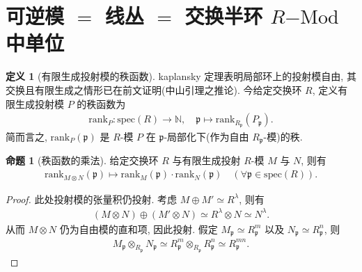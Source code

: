 \documentclass{MainStyle}
\theoremstyle{definition}
\theoremstyle{definition}
\theoremstyle{definition}
\newtheorem{definition}{定义}
\theoremstyle{definition}
\newtheorem{proposition}{命题}
\theoremstyle{definition}
\theoremstyle{definition}
\theoremstyle{definition}
\theoremstyle{remark}
\theoremstyle{remark}
\begin{document}
\maketitle

\section{可逆模 $=$ 线丛 $=$ 交换半环 $R\mathrm{-Mod}$ 中单位}

\begin{definition}[有限生成投射模的秩函数]
    kaplansky 定理表明局部环上的投射模自由, 其交换且有限生成之情形已在前文证明(中山引理之推论). 今给定交换环 $R$, 定义有限生成投射模 $P$ 的秩函数为
    \begin{align*}
        \mathrm{rank}_P:\mathrm{spec}(R)\to \mathbb N,\quad \mathfrak p\mapsto \mathrm{rank}_{R_{\mathfrak p}}(P_{\mathfrak p}).
    \end{align*}
    简而言之, $\mathrm{rank}_P(\mathfrak p)$ 是 $R$-模 $P$ 在 $\mathfrak p$-局部化下(作为自由 $R_{\mathfrak p}$-模)的秩.
\end{definition}

\begin{proposition}[秩函数的乘法]
    给定交换环 $R$ 与有限生成投射 $R$-模 $M$ 与 $N$, 则有
    \begin{align*}
        \mathrm{rank}_{M\otimes N}(\mathfrak p)\mapsto \mathrm{rank}_M(\mathfrak p)\cdot \mathrm{rank}_N(\mathfrak p)\quad (\forall \mathfrak p\in \mathrm{spec}(R)).
    \end{align*}
    \begin{proof}
        此处投射模的张量积仍投射. 考虑 $M\oplus M'\simeq R^\lambda$, 则有
        \begin{align*}
            (M\otimes N)\oplus (M'\otimes N)\simeq R^\lambda\otimes N \simeq N^\lambda.
        \end{align*}
        从而 $M\otimes N$ 仍为自由模的直和项, 因此投射. 假定 $M_{\mathfrak p}\simeq R_{\mathfrak p}^m$ 以及 $N_{\mathfrak p}\simeq R_{\mathfrak p}^n$, 则
        \begin{align*}
            M_{\mathfrak p}\otimes_{R_{\mathfrak p}} N_{\mathfrak p}\simeq R_{\mathfrak p}^m\otimes_{R_{\mathfrak p}} R_{\mathfrak p}^n\simeq R_{\mathfrak p}^{mn}.
        \end{align*}
    \end{proof}
\end{proposition}
\end{document}
